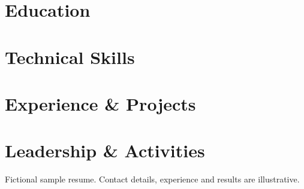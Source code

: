 \documentclass[10pt]{article}
\begin{document}
\pagestyle{others}\thispagestyle{first_page}



\section{Education}


\section{Technical Skills}


\section{Experience \& Projects}


\section{Leadership \& Activities}


\vfill
{\footnotesize\color{gray}Fictional sample resume. Contact details, experience and results are illustrative.}
\end{document}
